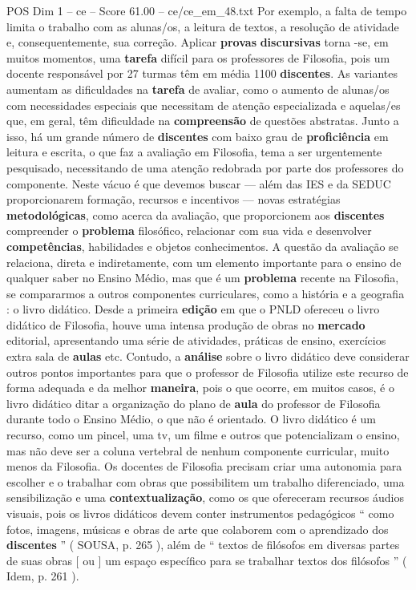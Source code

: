 \begin{textsample}{POS Dim 1 – ce – Score 61.00 – ce/ce\_em\_48.txt}
Por exemplo, a falta de tempo limita o trabalho com as alunas/os, a leitura de textos, a resolução de atividade e, consequentemente, sua correção.
Aplicar \textbf{provas} \textbf{discursivas} torna -se, em muitos momentos, uma \textbf{tarefa} difícil para os professores de Filosofia, pois um docente responsável por 27 turmas têm em média 1100 \textbf{discentes}.
As variantes aumentam as dificuldades na \textbf{tarefa} de avaliar, como o aumento de alunas/os com necessidades especiais que necessitam de atenção especializada e aquelas/es que, em geral, têm dificuldade na \textbf{compreensão} de questões abstratas.
Junto a isso, há um grande número de \textbf{discentes} com baixo grau de \textbf{proficiência} em leitura e escrita, o que faz a avaliação em Filosofia, tema a ser urgentemente pesquisado, necessitando de uma atenção redobrada por parte dos professores do componente.
Neste vácuo é que devemos buscar — além das IES e da SEDUC proporcionarem formação, recursos e incentivos — novas estratégias \textbf{metodológicas}, como acerca da avaliação, que proporcionem aos \textbf{discentes} compreender o \textbf{problema} filosófico, relacionar com sua vida e desenvolver \textbf{competências}, habilidades e objetos conhecimentos.
A questão da avaliação se relaciona, direta e indiretamente, com um elemento importante para o ensino de qualquer saber no Ensino Médio, mas que é um \textbf{problema} recente na Filosofia, se compararmos a outros componentes curriculares, como a história e a geografia : o livro didático.
Desde a primeira \textbf{edição} em que o PNLD ofereceu o livro didático de Filosofia, houve uma intensa produção de obras no \textbf{mercado} editorial, apresentando uma série de atividades, práticas de ensino, exercícios extra sala de \textbf{aulas} etc.
Contudo, a \textbf{análise} sobre o livro didático deve considerar outros pontos importantes para que o professor de Filosofia utilize este recurso de forma adequada e da melhor \textbf{maneira}, pois o que ocorre, em muitos casos, é o livro didático ditar a organização do plano de \textbf{aula} do professor de Filosofia durante todo o Ensino Médio, o que não é orientado.
O livro didático é um recurso, como um pincel, uma tv, um filme e outros que potencializam o ensino, mas não deve ser a coluna vertebral de nenhum componente curricular, muito menos da Filosofia.
Os docentes de Filosofia precisam criar uma autonomia para escolher e o trabalhar com obras que possibilitem um trabalho diferenciado, uma sensibilização e uma \textbf{contextualização}, como os que ofereceram recursos áudios visuais, pois os livros didáticos devem conter instrumentos pedagógicos “ como fotos, imagens, músicas e obras de arte que colaborem com o aprendizado dos \textbf{discentes} ” ( SOUSA, p. 265 ), além de “ textos de filósofos em diversas partes de suas obras [ ou ] um espaço específico para se trabalhar textos dos filósofos ” ( Idem, p. 261 ).

\end{textsample}
